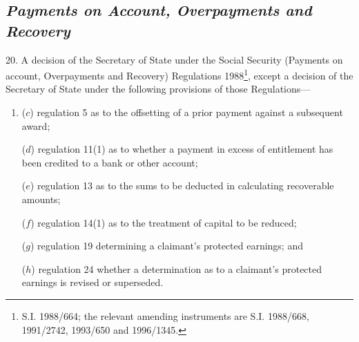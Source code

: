 \documentclass[12pt,a4paper]{article}
\begin{document}

\subsection*{\itshape Payments on Account, Overpayments and Recovery}

20.  A decision of the Secretary of State under the Social Security (Payments on account, Overpayments and Recovery) Regulations 1988\footnote{\frenchspacing S.I. 1988/664; the relevant amending instruments are S.I. 1988/668, 1991/2742, 1993/650 and 1996/1345.}, except a decision of the Secretary of State under the following provisions of those Regulations—
\begin{enumerate}\item[]
%

($c$) regulation 5 as to the offsetting of a prior payment against a subsequent award;

($d$) regulation 11(1) as to whether a payment in excess of entitlement has been credited to a bank or other account;

($e$) regulation 13 as to the sums to be deducted in calculating recoverable amounts;

($f$) regulation 14(1) as to the treatment of capital to be reduced;

($g$) regulation 19 determining a claimant’s protected earnings; and

($h$) regulation 24 whether a determination as to a claimant’s protected earnings is revised or superseded.
\end{enumerate}
\end{document}
